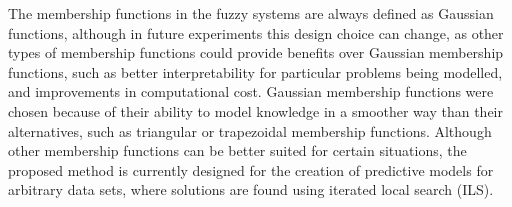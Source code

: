 \documentclass{ieeeaccess}
\begin{document}
The membership functions in the fuzzy systems are always defined as Gaussian functions, although in future experiments this design choice can
change, as other types of membership functions could provide benefits over Gaussian membership functions, such as better interpretability
for particular problems being modelled, and improvements in computational cost. Gaussian membership functions were chosen because
of their ability to model knowledge in a smoother way than their alternatives,  such as triangular or trapezoidal membership functions.
Although other membership functions can be better suited for certain
situations, the proposed method is currently designed for the creation
of predictive models for arbitrary data sets, where solutions are
found using iterated local search (ILS).


\end{document}
